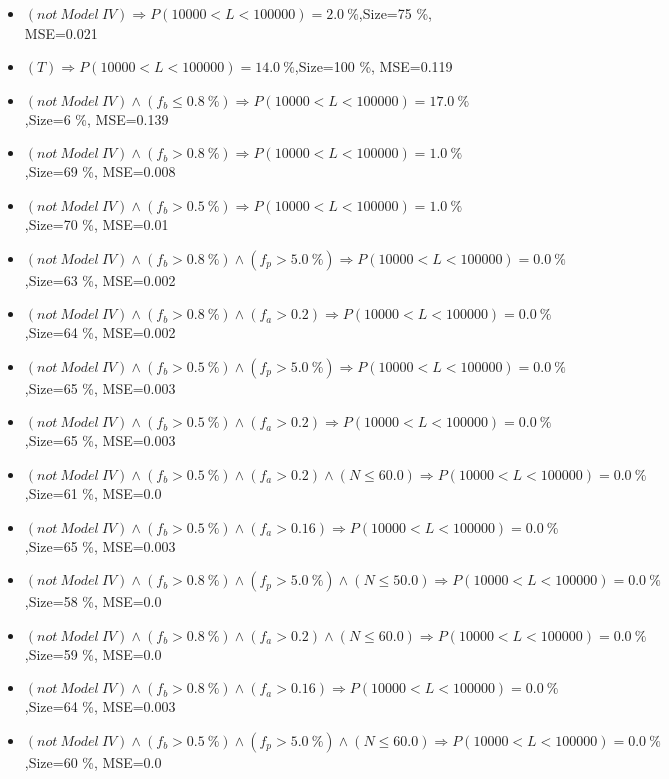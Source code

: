 \documentclass[numbered]{CSL}
\begin{document}
\begin{itemize}
\item $(not~Model~IV) \Rightarrow P(10 000 < L < 100 000) = 2.0~\%$,\hfill Size=75 \%, MSE=0.021
\item $(T) \Rightarrow P(10 000 < L < 100 000) = 14.0~\%$,\hfill Size=100 \%, MSE=0.119
\item $(not~Model~IV) \land (f_b \leq 0.8~\%) \Rightarrow P(10 000 < L < 100 000) = 17.0~\%$,\hfill Size=6 \%, MSE=0.139
\item $(not~Model~IV) \land (f_b > 0.8~\%) \Rightarrow P(10 000 < L < 100 000) = 1.0~\%$,\hfill Size=69 \%, MSE=0.008
\item $(not~Model~IV) \land (f_b > 0.5~\%) \Rightarrow P(10 000 < L < 100 000) = 1.0~\%$,\hfill Size=70 \%, MSE=0.01
\item $(not~Model~IV) \land (f_b > 0.8~\%) \land (f_p > 5.0~\%) \Rightarrow P(10 000 < L < 100 000) = 0.0~\%$,\hfill Size=63 \%, MSE=0.002
\item $(not~Model~IV) \land (f_b > 0.8~\%) \land (f_a > 0.2) \Rightarrow P(10 000 < L < 100 000) = 0.0~\%$,\hfill Size=64 \%, MSE=0.002
\item $(not~Model~IV) \land (f_b > 0.5~\%) \land (f_p > 5.0~\%) \Rightarrow P(10 000 < L < 100 000) = 0.0~\%$,\hfill Size=65 \%, MSE=0.003
\item $(not~Model~IV) \land (f_b > 0.5~\%) \land (f_a > 0.2) \Rightarrow P(10 000 < L < 100 000) = 0.0~\%$,\hfill Size=65 \%, MSE=0.003
\item $(not~Model~IV) \land (f_b > 0.5~\%) \land (f_a > 0.2) \land (N \leq 60.0) \Rightarrow P(10 000 < L < 100 000) = 0.0~\%$,\hfill Size=61 \%, MSE=0.0
\item $(not~Model~IV) \land (f_b > 0.5~\%) \land (f_a > 0.16) \Rightarrow P(10 000 < L < 100 000) = 0.0~\%$,\hfill Size=65 \%, MSE=0.003
\item $(not~Model~IV) \land (f_b > 0.8~\%) \land (f_p > 5.0~\%) \land (N \leq 50.0) \Rightarrow P(10 000 < L < 100 000) = 0.0~\%$,\hfill Size=58 \%, MSE=0.0
\item $(not~Model~IV) \land (f_b > 0.8~\%) \land (f_a > 0.2) \land (N \leq 60.0) \Rightarrow P(10 000 < L < 100 000) = 0.0~\%$,\hfill Size=59 \%, MSE=0.0
\item $(not~Model~IV) \land (f_b > 0.8~\%) \land (f_a > 0.16) \Rightarrow P(10 000 < L < 100 000) = 0.0~\%$,\hfill Size=64 \%, MSE=0.003
\item $(not~Model~IV) \land (f_b > 0.5~\%) \land (f_p > 5.0~\%) \land (N \leq 60.0) \Rightarrow P(10 000 < L < 100 000) = 0.0~\%$,\hfill Size=60 \%, MSE=0.0

\end{itemize}
\end{document}
